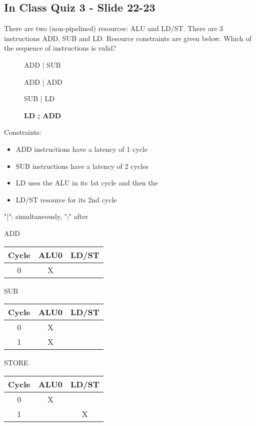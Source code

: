 \documentclass{report}
\newcommand{\cmark}{\ding{51}}%
\newcommand{\xmark}{\ding{55}}%
\begin{document}
\subsection{In Class Quiz 3 - Slide 22-23}
There are two (non-pipelined) resources: ALU and LD/ST. There are
3 instructions ADD, SUB and LD. Resource constraints are given below.
Which of the sequence of instructions is valid?
\vspace{-1em}
\begin{multicols}{2}
  \begin{description}
    \item [\xmark] ADD | SUB
    \item [\xmark] ADD | ADD
    \item [\xmark] SUB | LD
    \item [\cmark] \textbf{LD ; ADD}
  \end{description}
  \vfill\columnbreak
  \setlength{\leftskip}{-8em}
  Constraints:
  \begin{itemize}
    \setlength{\leftskip}{-8em}
    \item ADD instructions have a latency of 1 cycle
    \item SUB instructions have a latency of 2 cycles
    \item LD uses the ALU in its 1st cycle and then the
    \item LD/ST resource for its 2nd cycle
  \end{itemize}
  "|": simultaneously, ";" after
\end{multicols}
\vspace{-2em}
\begin{multicols}{3}
ADD \\
\begin{tabular}{|c|c|c|}
  \hline
  Cycle & ALU0 & LD/ST \\
  \hline
  0     & X    &       \\
  \hline
\end{tabular}
  \vfill\columnbreak
SUB \\
\begin{tabular}{|c|c|c|}
  \hline
  Cycle & ALU0 & LD/ST \\
  \hline
   0    & X    &       \\
  \hline
   1    & X    &       \\
  \hline
\end{tabular}
  \vfill\columnbreak
STORE \\
\begin{tabular}{|c|c|c|}
  \hline
  Cycle & ALU0 & LD/ST \\
  \hline
   0    & X    &       \\
  \hline
   1    &      & X     \\
  \hline
\end{tabular}
\end{multicols}
\end{document}
